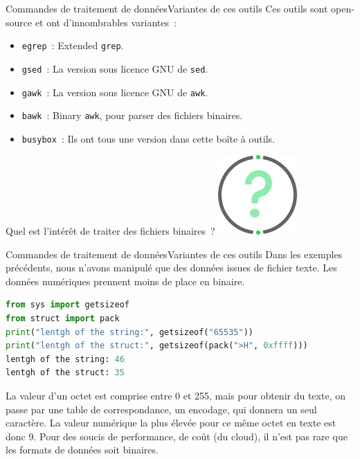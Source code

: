 \documentclass{beamer}
\begin{document}
    \begin{frame}{Commandes de traitement de données}{Variantes de ces outils}
        Ces outils sont open-source et ont d'innombrables variantes~:
        \begin{itemize}
            \item \lstinline{egrep}~: Extended \lstinline{grep}.
            \item \lstinline{gsed}~: La version sous licence GNU de \lstinline{sed}.
            \item \lstinline{gawk}~: La version sous licence GNU de \lstinline{awk}.
            \item \lstinline{bawk}~: Binary \lstinline{awk}, pour parser des fichiers binaires.
            \item \lstinline{busybox}~: Ils ont tous une version dans cette boîte à outils.
        \end{itemize}
        \bigbreak
        Quel est l'intérêt de traiter des fichiers binaires~?
        \bigbreak
        \centering
        \includegraphics[width=3cm]{image/question-mark}
    \end{frame}

    \begin{frame}[fragile]{Commandes de traitement de données}{Variantes de ces outils}
        Dans les exemples précédents, nous n'avons manipulé que des données issues de fichier texte.
        Les données numériques prennent moins de place en binaire.
        \begin{lstlisting}[language=python]
from sys import getsizeof
from struct import pack
print("lentgh of the string:", getsizeof("65535"))
print("lentgh of the struct:", getsizeof(pack(">H", 0xffff)))
lentgh of the string: 46
lentgh of the struct: 35
        \end{lstlisting}
        La valeur d'un octet est comprise entre 0 et 255, mais pour obtenir du texte, on passe par une table de correspondance, un encodage, qui donnera un seul caractère.
        La valeur numérique la plus élevée pour ce même octet en texte est donc 9.
        \bigbreak
        Pour des soucis de performance, de coût (du cloud), il n'est pas rare que les formats de données soit binaires.
    \end{frame}
\end{document}
